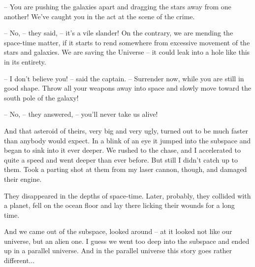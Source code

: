 \documentclass[ebook,oneside,final,openright]{memoir}
\begin{document}
– You are pushing the galaxies apart and dragging the stars away from one another! We’ve caught you in the act at the scene of the crime.\par
– No, – they said, – it’s a vile slander! On the contrary, we are mending the space-time matter, if it starts to rend somewhere from excessive movement of the stars and galaxies. We are saving the Universe – it could leak into a hole like this in its entirety.\par
– I don’t believe you! – said the captain. – Surrender now, while you are still in good shape. Throw all your weapons away into space and slowly move toward the south pole of the galaxy!\par
– No, – they answered, – you’ll never take us alive!\par
And that asteroid of theirs, very big and very ugly, turned out to be much faster than anybody would expect. In a blink of an eye it jumped into the subspace and began to sink into it ever deeper. We rushed to the chase, and I accelerated to quite a speed and went deeper than ever before. But still I didn’t catch up to them. Took a parting shot at them from my laser cannon, though, and damaged their engine.\par
They disappeared in the depths of space-time. Later, probably, they collided with a planet, fell on the ocean floor and lay there licking their wounds for a long time.\par
And we came out of the subspace, looked around – at it looked not like our universe, but an alien one. I guess we went too deep into the subspace and ended up in a parallel universe. And in the parallel universe this story goes rather different...
\end{document}
